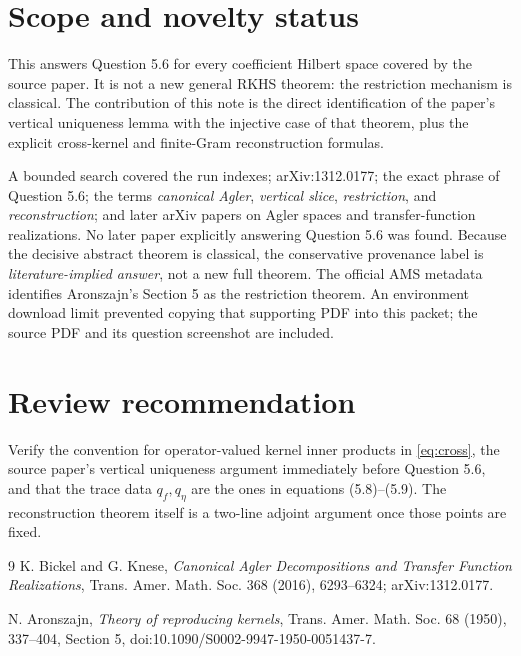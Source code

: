 \documentclass[11pt]{article}
\begin{document}
\section{Scope and novelty status}

This answers Question 5.6 for every coefficient Hilbert space covered by
the source paper.  It is not a new general RKHS theorem: the restriction
mechanism is classical.  The contribution of this note is the direct
identification of the paper's vertical uniqueness lemma with the injective
case of that theorem, plus the explicit cross-kernel and finite-Gram
reconstruction formulas.

A bounded search covered the run indexes; arXiv:1312.0177; the exact phrase
of Question 5.6; the terms \emph{canonical Agler}, \emph{vertical slice},
\emph{restriction}, and \emph{reconstruction}; and later arXiv papers on
Agler spaces and transfer-function realizations.  No later paper explicitly
answering Question 5.6 was found.  Because the decisive abstract theorem is
classical, the conservative provenance label is
\emph{literature-implied answer}, not a new full theorem.  The official AMS
metadata identifies Aronszajn's Section 5 as the restriction theorem.
An environment download limit prevented copying that supporting PDF into
this packet; the source PDF and its question screenshot are included.

\section{Review recommendation}

Verify the convention for operator-valued kernel inner products in
\eqref{eq:cross}, the source paper's vertical uniqueness argument immediately
before Question 5.6, and that the trace data \(q_f,q_\eta\) are the ones in
equations (5.8)--(5.9).  The reconstruction theorem itself is a two-line
adjoint argument once those points are fixed.

\begin{thebibliography}{9}
K. Bickel and G. Knese,
\emph{Canonical Agler Decompositions and Transfer Function Realizations},
Trans. Amer. Math. Soc. 368 (2016), 6293--6324;
arXiv:1312.0177.

N. Aronszajn,
\emph{Theory of reproducing kernels},
Trans. Amer. Math. Soc. 68 (1950), 337--404,
Section 5, doi:10.1090/S0002-9947-1950-0051437-7.
\end{thebibliography}
\end{document}
